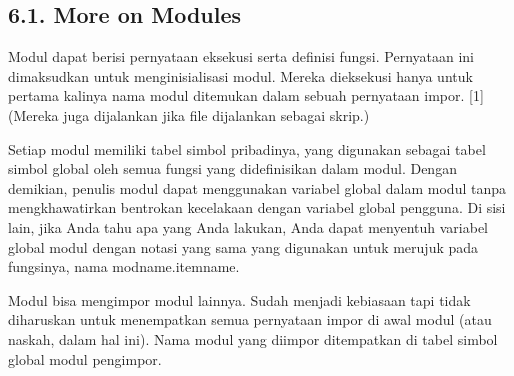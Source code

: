 \documentclass[a4paper,12pt]{report}
\begin{document}
\subsection*{6.1. More on Modules}
 \par
\noindent 
Modul dapat berisi pernyataan eksekusi serta definisi fungsi. Pernyataan ini dimaksudkan untuk menginisialisasi modul. Mereka dieksekusi hanya untuk pertama kalinya nama modul ditemukan dalam sebuah pernyataan impor. [1] (Mereka juga dijalankan jika file dijalankan sebagai skrip.) \par
\noindent 
Setiap modul memiliki tabel simbol pribadinya, yang digunakan sebagai tabel simbol global oleh semua fungsi yang didefinisikan dalam modul. Dengan demikian, penulis modul dapat menggunakan variabel global dalam modul tanpa mengkhawatirkan bentrokan kecelakaan dengan variabel global pengguna. Di sisi lain, jika Anda tahu apa yang Anda lakukan, Anda dapat menyentuh variabel global modul dengan notasi yang sama yang digunakan untuk merujuk pada fungsinya, nama modname.itemname. \par
\noindent 
Modul bisa mengimpor modul lainnya. Sudah menjadi kebiasaan tapi tidak diharuskan untuk menempatkan semua pernyataan impor di awal modul (atau naskah, dalam hal ini). Nama modul yang diimpor ditempatkan di tabel simbol global modul pengimpor. \par
\vspace{12pt}
\noindent 
\end{document}
